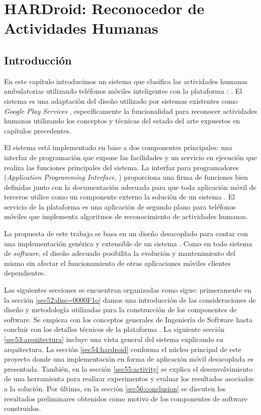 
\chapter{HARDroid: Reconocedor de Actividades Humanas}

\label{chap5:hardroid}

\section{Introducción}

\label{sec51:intro}En este capítulo introducimos un sistema que clasifica
las actividades humanas ambulatorias utilizando teléfonos móviles
inteligentes con la plataforma \emph{\texttrademark}:
\emph{}. El sistema es una adaptación del diseño utilizado
por sistemas existentes como \emph{Google Play Services} \cite{Google2013l},
específicamente la funcionalidad para reconocer actividades humanas
utilizando los conceptos y técnicas del estado del arte expuestos
en capítulos precedentes. 

El sistema \emph{} está implementado en base a dos
componentes principales: una interfaz de programación que expone las
facilidades y un servicio en ejecución que realiza las funciones principales
del sistema. La interfaz para programadores (\emph{Application Programming
Interface}, ) proporciona una firma de funciones bien definidas
junto con la documentación adecuada para que toda aplicación móvil
de terceros utilice como un componente externo la solución de un sistema
. El servicio de la plataforma \emph{} es
una aplicación de segundo plano para teléfonos móviles que implementa
algoritmos de reconocimiento de actividades humanas.

La propuesta de este trabajo se basa en un diseño desacoplado para
contar con una implementación genérica y extensible de un sistema
. Como en todo sistema de \emph{software}, el diseño adecuado
posibilita la evolución y mantenimiento del mismo sin afectar el funcionamiento
de otras aplicaciones móviles clientes dependientes. 

Las siguientes secciones se encuentran organizadas como sigue: primeramente
en la sección \ref{sec52:dise=0000F1o} damos una introducción de
las consideraciones de diseño y metodología utilizadas para la construcción
de los componentes de software. Se empieza con los conceptos generales
de Ingeniería de Software hasta concluir con los detalles técnicos
de la plataforma \emph{}. La siguiente sección \ref{sec53:arquitectura}
incluye una vista general del sistema explicando su arquitectura.
La sección \ref{sec54:hardroid} conforma el núcleo principal de este
proyecto donde una implementación  en forma de aplicación
móvil desacoplada es presentada. También, en la sección \ref{sec55:activity}
se explica el desenvolvimiento de una herramienta para realizar experimentos
y evaluar los resultados asociados a la solución. Por último, en la
sección \ref{sec56:conclusion} se discuten los resultados preliminares
obtenidos como motivo de los componentes de software construidos.

